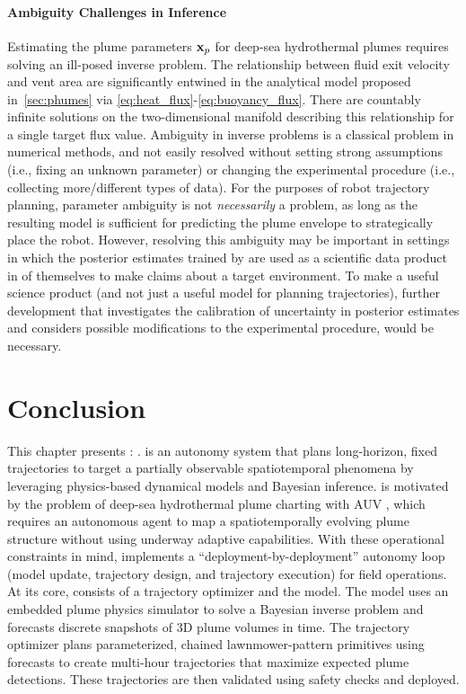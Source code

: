 \paragraph{Ambiguity Challenges in Inference}
Estimating the plume parameters $\mathbf{x}_p$ for deep-sea hydrothermal plumes requires solving an ill-posed inverse problem. The relationship between fluid exit velocity and vent area are significantly entwined in the analytical model proposed in~\cref{sec:phumes} via \cref{eq:heat_flux}-\cref{eq:buoyancy_flux}. There are countably infinite solutions on the two-dimensional manifold describing this relationship for a single target flux value. Ambiguity in inverse problems is a classical problem in numerical methods, and not easily resolved without setting strong assumptions (i.e., fixing an unknown parameter) or changing the experimental procedure (i.e., collecting more/different types of data). For the purposes of robot trajectory planning, parameter ambiguity is not \emph{necessarily} a problem, as long as the resulting model is sufficient for predicting the plume envelope to strategically place the robot. However, resolving this ambiguity may be important in settings in which the posterior estimates trained by \PHUMES are used as a scientific data product in of themselves to make claims about a target environment. To make \PHUMES a useful science product (and not just a useful model for planning trajectories), further development that investigates the calibration of uncertainty in posterior estimates and considers possible modifications to the experimental procedure, would be necessary. 


\section{Conclusion}
\label{sec:phortex_conclusion}
This chapter presents \PHORTEX: \phortex. \PHORTEX is an autonomy system that plans long-horizon, fixed trajectories to target a partially observable spatiotemporal phenomena by leveraging physics-based dynamical models and Bayesian inference. \PHORTEX is motivated by the problem of deep-sea hydrothermal plume charting with AUV \Sentry, which requires an autonomous agent to map a spatiotemporally evolving plume structure without using underway adaptive capabilities. With these operational constraints in mind, \PHORTEX implements a ``deployment-by-deployment'' autonomy loop (model update, trajectory design, and trajectory execution) for field operations. At its core, \PHORTEX consists of a trajectory optimizer and the \PHUMES model. The \PHUMES model uses an embedded plume physics simulator to solve a Bayesian inverse problem and forecasts discrete snapshots of 3D plume volumes in time. The trajectory optimizer plans parameterized, chained lawnmower-pattern primitives using \PHUMES forecasts to create multi-hour trajectories that maximize expected plume detections. These trajectories are then validated using \Sentry safety checks and deployed. 

